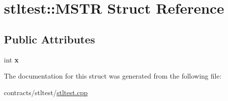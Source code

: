 \hypertarget{structstltest_1_1_m_s_t_r}{}\section{stltest\+:\+:M\+S\+TR Struct Reference}
\label{structstltest_1_1_m_s_t_r}
\subsection*{Public Attributes}
\begin{DoxyCompactItemize}
\item 
\mbox{\label{structstltest_1_1_m_s_t_r_ae71b975fb78a51732ec647f8763c1b8a}} 
int {\bfseries x}
\end{DoxyCompactItemize}


The documentation for this struct was generated from the following file\+:\begin{DoxyCompactItemize}
\item 
contracts/stltest/\mbox{\hyperlink{stltest_8cpp}{stltest.\+cpp}}\end{DoxyCompactItemize}
